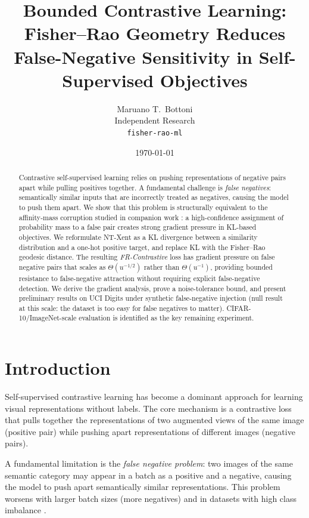 \documentclass[11pt]{article}
\title{Bounded Contrastive Learning:\\
Fisher--Rao Geometry Reduces False-Negative Sensitivity in Self-Supervised Objectives}
\author{
  Maruano T.\ Bottoni \\
  Independent Research \\
  \texttt{fisher-rao-ml}
}
\date{\today}
\begin{document}
\maketitle

\begin{abstract}
Contrastive self-supervised learning relies on pushing representations of negative pairs
apart while pulling positives together. A fundamental challenge is \emph{false negatives}:
semantically similar inputs that are incorrectly treated as negatives, causing the model to
push them apart. We show that this problem is structurally equivalent to the
affinity-mass corruption studied in companion work \citep{bottoni2026fisherrao}: a
high-confidence assignment of probability mass to a false pair creates strong gradient
pressure in KL-based objectives. We reformulate NT-Xent \citep{chen2020simple} as a
KL divergence between a similarity distribution and a one-hot positive target, and replace
KL with the Fisher--Rao geodesic distance. The resulting \emph{FR-Contrastive} loss has
gradient pressure on false negative pairs that scales as $\Theta(u^{-1/2})$ rather than
$\Theta(u^{-1})$, providing bounded resistance to false-negative attraction without
requiring explicit false-negative detection. We derive the gradient analysis, prove a
noise-tolerance bound, and present preliminary results on UCI Digits under synthetic
false-negative injection (null result at this scale: the dataset is too easy for
false negatives to matter). CIFAR-10/ImageNet-scale evaluation is identified as the
key remaining experiment.
\end{abstract}

\section{Introduction}

Self-supervised contrastive learning \citep{chen2020simple,he2020momentum,zbontar2021barlow}
has become a dominant approach for learning visual representations without labels. The core
mechanism is a contrastive loss that pulls together the representations of two augmented
views of the same image (positive pair) while pushing apart representations of different
images (negative pairs).

A fundamental limitation is the \emph{false negative problem}: two images of the same
semantic category may appear in a batch as a positive and a negative, causing the model to
push apart semantically similar representations. This problem worsens with larger batch
sizes (more negatives) and in datasets with high class imbalance \citep{chuang2020debiased}.
\end{document}
